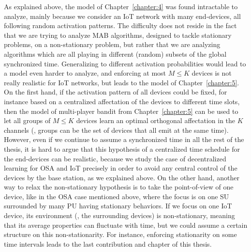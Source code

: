 As explained above, the model of Chapter~\ref{chapter:4} was found intractable to analyze, mainly because we consider an IoT network with many end-devices, all following random activation patterns.
The difficulty does not reside in the fact that we are trying to analyze MAB algorithms, designed to tackle stationary problems, on a non-stationary problem,
but rather that we are analyzing algorithms which are all playing in different (random) subsets of the global synchronized time.
Generalizing to different activation probabilities would lead to a model even harder to analyze, and enforcing at most $M \leq K$ devices is not really realistic for IoT networks, but leads to the model of Chapter~\ref{chapter:5}.\\
%
\indent
On the first hand, if the activation pattern of all devices could be fixed, for instance based on a centralized affectation of the devices to different time slots, then the model of multi-player bandit from Chapter~\ref{chapter:5} can be used to let all groups of $M \leq K$ devices learn an optimal orthogonal affectation in the $K$ channels (\eg, groups can be the set of devices that all emit at the same time).
%
However, even if we continue to assume a synchronized time in all the rest of the thesis,
it is hard to argue that this hypothesis of a centralized time schedule for the end-devices can be realistic, because we study the case of decentralized learning for OSA and IoT precisely in order to avoid any central control of the devices by the base station, as we explained above.
%
On the other hand, another way to relax the non-stationary hypothesis is to take the point-of-view of one device, like in the OSA case mentioned above, where the focus is on one SU surrounded by many PU having stationary behaviors.
If we focus on one IoT device, its environment (\ie, the surrounding devices) is non-stationary, meaning that its average properties can fluctuate with time, but we could assume a certain structure on this non-stationarity.
For instance, enforcing stationarity on some time intervals leads to the last contribution and chapter of this thesis.


